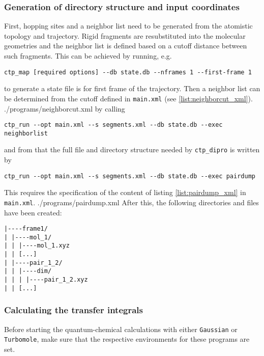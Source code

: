 \subsubsection{Generation of directory structure and input coordinates}
First, hopping sites and a neighbor list need to be generated from the atomistic topology and trajectory. Rigid fragments are resubstituted into the molecular geometries and the neighbor list is defined based on a cutoff distance between such fragments. This can be achieved by running, e.g.  
\begin{verbatim}
ctp_map [required options] --db state.db --nframes 1 --first-frame 1
\end{verbatim}
to generate a state file is for first frame of the trajectory. Then a neighbor list can be determined from the cutoff defined in {\tt main.xml} (see \ref{list:neighborcut_xml}).
 {./programs/neighborcut.xml}
by calling
\begin{verbatim}
ctp_run --opt main.xml --s segments.xml --db state.db --exec neighborlist
\end{verbatim}
and from that the full file and directory structure needed by {\tt ctp\_dipro} is written by 
\begin{verbatim}
ctp_run --opt main.xml --s segments.xml --db state.db --exec pairdump
\end{verbatim}
This requires the specification of the content of listing \ref{list:pairdump_xml} in {\tt main.xml}.
 {./programs/pairdump.xml}
After this, the following directories and files have been created:
\begin{verbatim}
|----frame1/
| |----mol_1/
| | |----mol_1.xyz
| | [...]
| |----pair_1_2/
| | |----dim/
| | | |----pair_1_2.xyz
| | [...]
\end{verbatim}

\subsubsection{Calculating the transfer integrals}
Before starting the quantum-chemical calculations with either {\tt Gaussian} or {\tt Turbomole}, make sure that the respective environments for these programs are set. 

